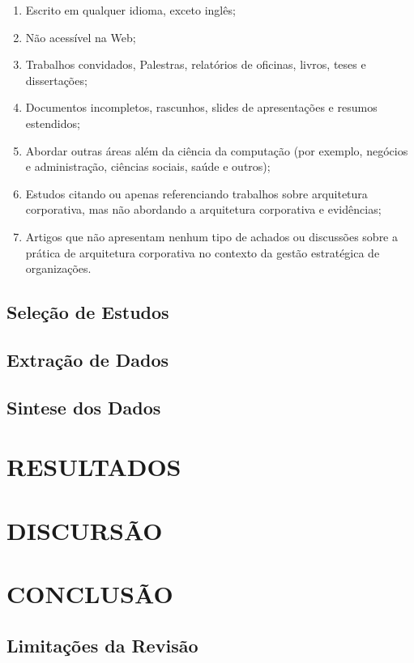 \begin{enumerate}
    \item Escrito em qualquer idioma, exceto inglês;
    \item Não acessível na Web;
    \item Trabalhos convidados, Palestras, relatórios de oficinas, livros, teses e dissertações;
    \item Documentos incompletos, rascunhos, slides de apresentações e resumos estendidos; 
    \item Abordar outras áreas além da ciência da computação (por exemplo, negócios e administração, ciências sociais, saúde e outros);
    \item Estudos citando ou apenas referenciando trabalhos sobre arquitetura corporativa, mas não abordando a arquitetura corporativa e evidências;
    \item Artigos que não apresentam nenhum tipo de achados ou discussões sobre a prática de arquitetura corporativa no contexto da gestão estratégica de organizações.
\end{enumerate}

\subsection{Seleção de Estudos}
\subsection{Extração de Dados}
\subsection{Sintese dos Dados}

\section{RESULTADOS}


\section{DISCURSÃO}

\section{CONCLUSÃO}
\subsection{Limitações da Revisão}

